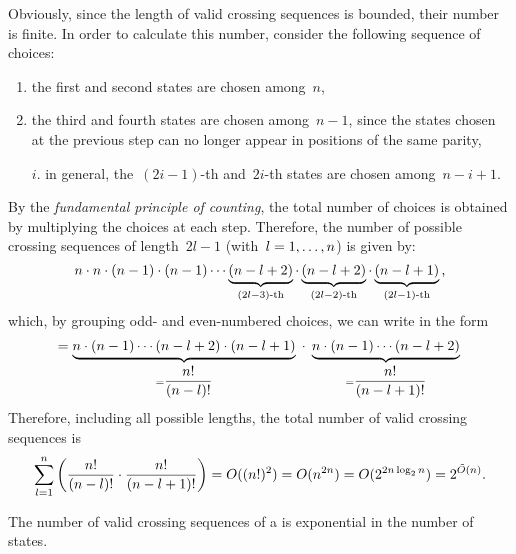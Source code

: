 Obviously, since the length of valid crossing sequences is bounded, their number is finite.
In order to calculate this number, consider the following sequence of choices:
\begin{enumerate}
	\item \label{itm:num-crosseq-1} the first and second states are chosen among~$n$,
	\item the third and fourth states are chosen among~$n-1$, since the states chosen at the previous step can no longer appear in positions of the same parity,
	\item[$i$.] in general, the~$(2i-1)$-th and~$2i$-th states are chosen among~$n-i+1$.
\end{enumerate}
By the \emph{fundamental principle of counting}, the total number of choices is obtained by multiplying the choices at each step.
Therefore, the number of possible crossing sequences of length~$2l-1$ (with~$l=1,\dots,n$) is given by:
\begin{equation*}
	n \cdot n \cdot (n-1) \cdot (n-1) \cdots \underbrace{(n-l+2)}_{(2l-3)\text{-th}} \cdot \underbrace{(n-l+2)}_{(2l-2)\text{-th}} \cdot \underbrace{(n-l+1)}_{(2l-1)\text{-th}} \text,
\end{equation*}
which, by grouping odd- and even-numbered choices, we can write in the form
\begin{equation*}
	= \underbrace{n \cdot (n-1) \cdots (n-l+2) \cdot (n-l+1)}_{=\dfrac{n!}{(n-l)!}} \; \cdot \; \underbrace{n \cdot (n-1) \cdots (n-l+2)}_{=\dfrac{n!}{(n-l+1)!}} \\
\end{equation*}
Therefore, including all possible lengths, the total number of valid crossing sequences is
\begin{align*}
	\sum_{l=1}^n \left(\frac{n!}{(n-l)!}\cdot\frac{n!}{(n-l+1)!}\right) = O((n!)^2) = O(n^{2n}) = O(2^{2n \log_2 n}) = 2^{\tilde O(n)} \text.
\end{align*}

\begin{fact}\label{fact:crossing-2DFA-num}
	The number of valid crossing sequences of a \TDFA is exponential in the number of states.
\end{fact}


